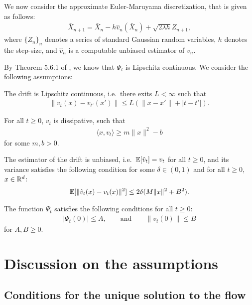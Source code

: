 We now consider the approximate Euler-Maruyama discretization, that is given as follows:
\begin{align}
\bar{X}_{n+1} = \bar{X}_n - h \hat{v}_n(\bar{X}_n) + \sqrt{2 \lambda h} Z_{n+1},
\end{align}
where $\{Z_n\}_{n}$ denotes a series of standard Gaussian random variables, $h$ denotes the step-size, and $\hat{v}_n$ is a computable unbiased estimator of $v_n$.


By Theorem 5.6.1 of \cite{bonnotte2013unidimensional}, we know that $\Psi_t$ is Lipschitz continuous. We consider the following assumptions:
\begin{assumption}
\label{asmp:lipschitz}
The drift is Lipschitz continuous, i.e.\ there exits $L < \infty$ such that
\begin{align}
\| v_t(x) - v_{t'}(x') \| \leq L ( \|x-x' \| + |t-t'|).
\end{align}
\end{assumption}
%
\begin{assumption}
\label{asmp:dissip}
For all $t \geq 0$, $v_t$ is dissipative, such that
\begin{align}
\langle x, v_t \rangle \geq m \|x\|^2 -b
\end{align}
for some $m,b >0$.
\end{assumption}
%
\begin{assumption}
\label{asmp:stochgrad}
The estimator of the drift is unbiased, i.e.\ $\mathbb{E}[\hat{v}_t] = v_t$ for all $t \geq 0$, and its variance satisfies the following condition for some $\delta \in (0,1)$ and for all $t\geq 0$, $x \in \mathbb{R}^d$:
\begin{align}
\mathbb{E}[ \|\hat{v}_t(x) - v_t(x) \|^2] \leq 2 \delta(M \|x\|^2 + B^2).
\end{align}
\end{assumption}
%
\begin{assumption}
The function $\Psi_t$ satisfies the following conditions for all $t \geq 0$:
\begin{align}
|\Psi_t(0)| \leq A, \qquad \text{and} \qquad \|v_t(0)\| \leq B
\end{align}
for $A,B \geq 0$.
\end{assumption}

\section{Discussion on the assumptions}

\subsection{Conditions for the unique solution to the flow}

